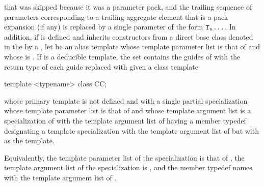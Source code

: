that was skipped because it was a parameter pack, and
the trailing sequence of parameters corresponding
to a trailing aggregate element that is a pack expansion (if any)
is replaced by a single parameter of the form $\texttt{\protect T}_n \texttt{\protect...}$.
In addition,
if  is defined and
inherits constructors
from a direct base class denoted in the 
by a  ,
let  be an alias template
whose template parameter list is that of  and
whose  is .
If  is a deducible template,
the set contains the guides of 
with the return type  of each guide
replaced with  given a class template
\begin{codeblock}
template <typename> class CC;
\end{codeblock}
whose primary template is not defined and
with a single partial specialization
whose template parameter list is that of  and
whose template argument list is a specialization of  with
the template argument list of 
having a member typedef  designating a template specialization with
the template argument list of  but
with  as the template.
\begin{note}
Equivalently,
the template parameter list of the specialization is that of ,
the template argument list of the specialization is , and
the member typedef names  with the template argument list of .
\end{note}

